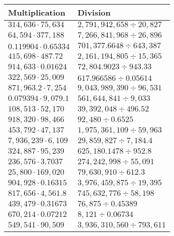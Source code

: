 \begin{longtable}[]{@{}ll@{}}
\toprule
Multiplication & Division\tabularnewline
\midrule
\endhead
\(314,636\cdot75,634\) & \(2,791,942,658÷20,827\)\tabularnewline
\(64,594\cdot377,188\) & \(7,266,841,968÷26,896\)\tabularnewline
\(0.119904\cdot0.65334\) & \(701,377.6648÷643,387\)\tabularnewline
\(415,698\cdot487.72\) & \(2,161,194,805÷15,365\)\tabularnewline
\(914,633\cdot0.01624\) & \(72,804.9023÷943.33\)\tabularnewline
\(322,569\cdot25,009\) & \(617.966586÷0.05614\)\tabularnewline
\(871,963.2\cdot7,254\) & \(9,043,989,390÷96,531\)\tabularnewline
\(0.079394\cdot9,079.1\) & \(561,644,841÷9,033\)\tabularnewline
\(108,513\cdot52,170\) & \(39,392,048÷496.52\)\tabularnewline
\(918,320\cdot98,466\) & \(92,480÷0.6525\)\tabularnewline
\(453,792\cdot47,137\) & \(1,975,361,109÷59,963\)\tabularnewline
\(7,936,239\cdot6,109\) & \(29,859,827÷7,184.4\)\tabularnewline
\(324,887\cdot95,239\) & \(625,180.1478÷952.8\)\tabularnewline
\(236,576\cdot3.7037\) & \(274,242,998÷55,091\)\tabularnewline
\(25,800\cdot169,020\) & \(79,630,910÷612.3\)\tabularnewline
\(904,928\cdot0.16315\) & \(3,976,459,875÷19,395\)\tabularnewline
\(817,656\cdot4,561.8\) & \(745,632,776÷58,198\)\tabularnewline
\(439,479\cdot0.31673\) & \(76,875÷0.45389\)\tabularnewline
\(670,214\cdot0.07212\) & \(8,121÷0.06734\)\tabularnewline
\(549,541\cdot90,509\) & \(3,936,310,560÷793,611\)\tabularnewline
\bottomrule
\end{longtable}
